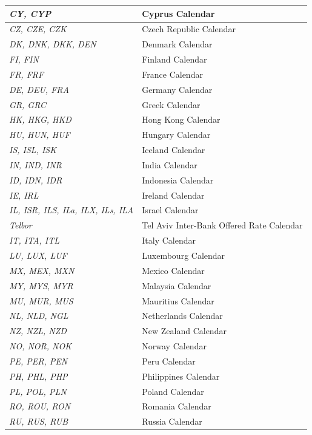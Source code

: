\begin{longtable}{| p{} | p{} |}
    \emph{CY, CYP} & Cyprus Calendar \\ \hline
    \emph{CZ, CZE, CZK} & Czech Republic Calendar \\ \hline
    \emph{DK, DNK, DKK, DEN} & Denmark Calendar \\ \hline
    \emph{FI, FIN} & Finland Calendar \\ \hline
    \emph{FR, FRF} & France Calendar \\ \hline
    \emph{DE, DEU, FRA} & Germany Calendar \\ \hline
    \emph{GR, GRC} & Greek Calendar \\ \hline
    \emph{HK, HKG, HKD} & Hong Kong Calendar \\ \hline
    \emph{HU, HUN, HUF} & Hungary Calendar \\ \hline
    \emph{IS, ISL, ISK} & Iceland Calendar \\ \hline
    \emph{IN, IND, INR} & India Calendar \\ \hline
    \emph{ID, IDN, IDR} & Indonesia Calendar \\ \hline
    \emph{IE, IRL} & Ireland Calendar \\ \hline
    \emph{IL, ISR, ILS, ILa, ILX, ILs, ILA} & Israel Calendar \\ \hline
    \emph{Telbor} & Tel Aviv Inter-Bank Offered Rate Calendar \\ \hline
    \emph{IT, ITA, ITL} & Italy Calendar \\ \hline
    \emph{LU, LUX, LUF} & Luxembourg Calendar \\ \hline    
    \emph{MX, MEX, MXN} & Mexico Calendar \\ \hline
    \emph{MY, MYS, MYR} & Malaysia Calendar \\ \hline
    \emph{MU, MUR, MUS} & Mauritius Calendar \\ \hline
    \emph{NL, NLD, NGL} & Netherlands Calendar \\ \hline
    \emph{NZ, NZL, NZD} & New Zealand Calendar\\ \hline
    \emph{NO, NOR, NOK} & Norway Calendar \\ \hline
    \emph{PE, PER, PEN} & Peru Calendar \\ \hline
    \emph{PH, PHL, PHP} & Philippines Calendar \\ \hline
    \emph{PL, POL, PLN} & Poland Calendar \\ \hline
    \emph{RO, ROU, RON} & Romania Calendar \\ \hline
    \emph{RU, RUS, RUB} & Russia Calendar \\ \hline

\end{longtable}
